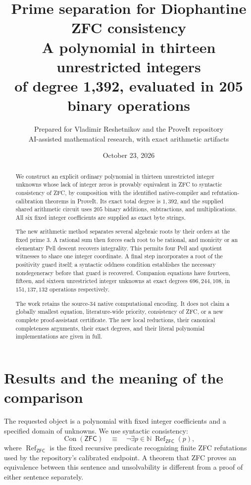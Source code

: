 \documentclass[11pt]{article}
\title{Prime separation for Diophantine ZFC consistency\\[5pt]
\large A polynomial in thirteen unrestricted integers\\
of degree 1,392, evaluated in 205 binary operations}
\author{Prepared for Vladimir Reshetnikov and the ProveIt repository\\
\small AI-assisted mathematical research, with exact arithmetic artifacts}
\date{October 23, 2026}
\theoremstyle{definition}
\theoremstyle{remark}
\newcommand{\N}{\mathbb N}
\newcommand{\ZFC}{\mathsf{ZFC}}
\newcommand{\Con}{\operatorname{Con}}
\newcommand{\RefCode}{\operatorname{Ref}}
\begin{document}
\maketitle
\begin{abstract}
We construct an explicit ordinary polynomial in thirteen unrestricted
integer unknowns whose lack of integer zeros is provably equivalent in
ZFC to syntactic consistency of ZFC, by composition with the identified
native-compiler and refutation-calibration theorems in ProveIt. Its exact
total degree is \(1,392\), and the supplied shared arithmetic circuit uses
\(205\) binary additions, subtractions, and multiplications. All six fixed
integer coefficients are supplied as exact byte strings.

The new arithmetic method separates several algebraic roots by their
orders at the fixed prime \(3\). A rational sum then forces each root to be
rational, and monicity or an elementary Pell descent recovers integrality.
This permits four Pell and quotient witnesses to share one integer
coordinate. A final step incorporates a root of the positivity guard
itself; a syntactic oddness condition establishes the necessary
nondegeneracy before that guard is recovered. Companion equations have
fourteen, fifteen, and sixteen unrestricted integer unknowns at exact
degrees \(696,244,108\), in \(151,137,132\) operations respectively.

The work retains the source-34 native computational encoding. It does not
claim a globally smallest equation, literature-wide priority, consistency
of ZFC, or a new complete proof-assistant certificate. The new local
reductions, their canonical completeness arguments, their exact degrees,
and their literal polynomial implementations are given in full.
\end{abstract}
\clearpage
\tableofcontents
\clearpage

\section{Results and the meaning of the comparison}
\label{sec:results}

The requested object is a polynomial with fixed integer coefficients and
a specified domain of unknowns. We use syntactic consistency:
\[
 \Con(\ZFC)\quad\equiv\quad
 \neg\exists p\in\N\ \RefCode_{\ZFC}(p),
\]
where \(\RefCode_{\ZFC}\) is the fixed recursive predicate recognizing finite
ZFC refutations used by the repository's calibrated endpoint. A theorem
that ZFC proves an equivalence between this sentence and unsolvability is
different from a proof of either sentence separately.
\end{document}
